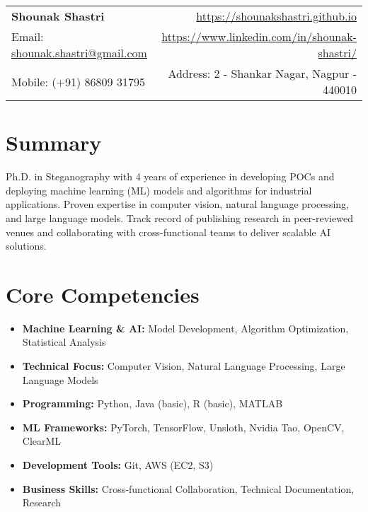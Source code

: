 \documentclass[a4paper,11pt]{article}
\begin{document}
\begin{tabular*}{\textwidth}{l@{\extracolsep{\fill}}r}
  \textbf{\Large Shounak Shastri}
   & \href{https://shounakshastri.github.io}{https://shounakshastri.github.io}\\
  Email: \href{mailto: shounak.shastri@gmail.com}{shounak.shastri@gmail.com}
  & \href{https://www.linkedin.com/in/shounak-shastri/}{https://www.linkedin.com/in/shounak-shastri/}\\
  Mobile: (+91) 86809 31795 & Address: 2 - Shankar Nagar, Nagpur - 440010\\
\end{tabular*}

\section{Summary}
  \justify
    Ph.D. in Steganography with 4 years of experience in developing POCs and deploying machine learning (ML) models and algorithms for industrial applications. Proven expertise in computer vision, natural language processing, and large language models. Track record of publishing research in peer-reviewed venues and collaborating with cross-functional teams to deliver scalable AI solutions.

\section{Core Competencies}
  \begin{itemize}[leftmargin=*, itemsep = -2pt]
    \item{\textbf{Machine Learning \& AI:}{ Model Development, Algorithm Optimization, Statistical Analysis}}
    \item{\textbf{Technical Focus:}{ Computer Vision, Natural Language Processing, Large Language Models}}
    \item{\textbf{Programming:}{ Python, Java (basic), R (basic), MATLAB}}
    \item{\textbf{ML Frameworks:}{ PyTorch, TensorFlow, Unsloth, Nvidia Tao, OpenCV, ClearML}}
    \item{\textbf{Development Tools:}{ Git, AWS (EC2, S3)}}
    \item{\textbf{Business Skills:}{ Cross-functional Collaboration, Technical Documentation, Research}}
  \end{itemize}

\end{document}
